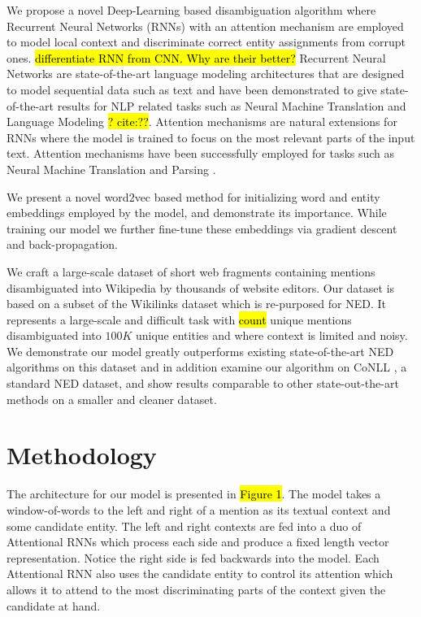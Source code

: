 \documentclass[11pt]{article}
\begin{document}
	We propose a novel Deep-Learning based disambiguation algorithm where Recurrent Neural Networks (RNNs) with an attention mechanism are employed to model local context and discriminate correct entity assignments from corrupt ones. \hl{differentiate RNN from CNN. Why are their better?} Recurrent Neural Networks are state-of-the-art language modeling architectures that are designed to model sequential data such as text and have been demonstrated to give state-of-the-art results for NLP related tasks such as Neural Machine Translation \cite{bahdanau2014neural} and Language Modeling \hl{? cite:??}. Attention mechanisms are natural extensions for RNNs where the model is trained to focus on the most relevant parts of the input text. Attention mechanisms have been successfully employed for tasks such as Neural Machine Translation \cite{bahdanau2014neural} and Parsing \cite{vinyals2015grammar}. 
	
	We present a novel word2vec \cite{mikolov2013distributed} based method for initializing word and entity embeddings employed by the model, and demonstrate its importance. While training our model we further fine-tune these embeddings via gradient descent and back-propagation.
		
	We craft a large-scale dataset of short web fragments containing mentions disambiguated into Wikipedia by thousands of website editors. Our dataset is based on a subset of the Wikilinks dataset \cite{singh12:wiki-links} which is re-purposed for NED. It represents a large-scale and difficult task with \hl{count} unique mentions disambiguated into $100K$ unique entities and where context is limited and noisy. We demonstrate our model greatly outperforms existing state-of-the-art NED algorithms on this dataset and in addition examine our algorithm on CoNLL \cite{hoffart2011robust}, a standard NED dataset, and show results comparable to other state-out-the-art methods on a smaller and cleaner dataset.
	
	\section{Methodology}
	
	The architecture for our model is presented in \hl{Figure 1}. The model takes a window-of-words to the left and right of a mention as its textual context and some candidate entity. The left and right contexts are fed into a duo of Attentional RNNs which process each side and produce a fixed length vector representation. Notice the right side is fed backwards into the model. Each Attentional RNN also uses the candidate entity to control its attention which allows it to attend to the most discriminating parts of the context given the candidate at hand. 
	
\end{document}
